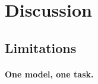 \documentclass{article}
\begin{document}
%
%
%
%
%



%

\section{Discussion}
\label{sec:discussion}



\subsection{Limitations}

\paragraph{One model, one task.}
\end{document}
